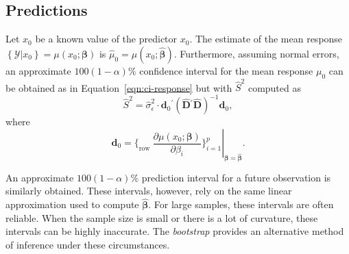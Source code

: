 \documentclass[cmfont,usenames,dvipsnames,leqno]{afit-etd}\usepackage[]{graphicx}\usepackage[]{color}
\newcommand{\trans}{\ensuremath{^\prime}}
\newcommand{\mc}[1]{\ensuremath{\mathcal{#1}}}
\newcommand{\wh}[1]{\ensuremath{\widehat{#1}}}
\begin{document}
\subsection{Predictions}
Let $x_0$ be a known value of the predictor $x_0$. The estimate of the mean response $\left\{\mc{Y} | x_0\right\} = \mu(x_0; \bm{\beta})$ is $\wh{\mu}_0 = \mu(x_0; \wh{\bm{\beta}})$. Furthermore, assuming normal errors, an approximate $100(1 - \alpha)\%$ confidence interval for the mean response $\mu_0$ can be obtained as in Equation~\eqref{eqn:ci-response} but with $\widehat{S}^2$ computed as 
\begin{equation*}
  \widehat{S}^2 = \wh{\sigma}_\epsilon^2 \cdot \bm{d}_0\trans\left(\widehat{\bm{D}}\trans\widehat{\bm{D}}\right)^{-1}\bm{d}_0,
\end{equation*}
where
\begin{equation*}
  \bm{d}_0 = \left. \bigg\lbrace_\text{row } \frac{\partial \mu\left(x_0; \bm{\beta}\right)}{\partial\beta_i} \bigg\rbrace_{i = 1}^p \right|_{\bm{\beta} = \wh{\bm{\beta}}}.
\end{equation*}

An approximate $100(1 - \alpha)\%$ prediction interval for a future observation is similarly obtained. These intervals, however, rely on the same linear approximation used to compute $\wh{\bm{\beta}}$. For large samples, these intervals are often reliable. When the sample size is small or there is a lot of curvature, these intervals can be highly inaccurate. The \textit{bootstrap} \citep{efron_bootstrap_1979} provides an alternative method of inference under these circumstances.
\end{document}
